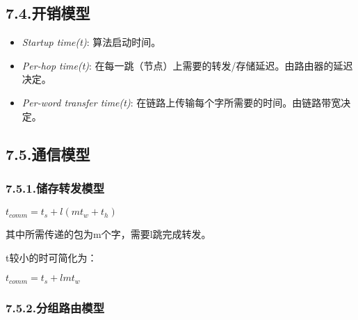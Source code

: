 \documentclass{article}
\begin{document}
\subsection{7.4.\hspace*{0.5em}开销模型}\label{section}%

\begin{itemize}[noitemsep,topsep=\mdcompacttopsep]%

\item{}\emph{Startup time(t)}: 算法启动时间。%

\item{}\emph{Per-hop time(t)}: 在每一跳（节点）上需要的转发/存储延迟。由路由器的延迟决定。%

\item{}\emph{Per-word transfer time(t)}: 在链路上传输每个字所需要的时间。由链路带宽决定。%
\end{itemize}%

\subsection{7.5.\hspace*{0.5em}通信模型}\label{section}%

\subsubsection{7.5.1.\hspace*{0.5em}储存转发模型}\label{section}%

\noindent{}$t_{comm} = t_s +l(mt_w+t_h)$%

其中所需传递的包为m个字，需要l跳完成转发。%

t较小的时可简化为：%

$t_{comm} = t_s + lmt_w$%

\subsubsection{7.5.2.\hspace*{0.5em}分组路由模型}\label{section}%
\end{document}

